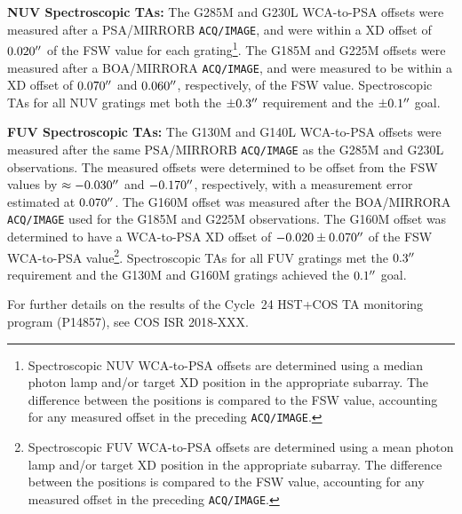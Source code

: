 \documentclass[12pt]{reportj}
\def\arcsec{\hbox{$^{\prime\prime}$}}
\newcommand{\pid}[1]{{\rm P}#1}
\newcommand{\tacq}[1]{\texttt{ACQ/#1}}
\newcommand{\tamonISR}[1]{COS ISR 2018-XXX}
\begin{document}
\begin{description}
	\clearpage
\item{\bf NUV Spectroscopic TAs:}
	The G285M and G230L WCA-to-PSA offsets were measured after a PSA/MIRRORB \tacq{IMAGE}, and were within a XD offset of $0.020\arcsec$ of the FSW value for each grating\footnote{Spectroscopic NUV WCA-to-PSA offsets are determined using a median photon lamp and/or target XD position in the appropriate subarray. The difference between the positions is compared to the FSW value, accounting for any measured offset in the preceding \tacq{IMAGE}.}.
	The G185M and G225M offsets were measured after a BOA/MIRRORA \tacq{IMAGE}, and were measured to be within a XD offset of $0.070\arcsec$ and $0.060\arcsec$, respectively, of the FSW value. Spectroscopic TAs for all NUV gratings met both the $\pm0.3\arcsec$ requirement and the $\pm0.1\arcsec$ goal.
\item{\bf FUV Spectroscopic TAs:}
	The G130M and G140L WCA-to-PSA offsets were measured after the same PSA/MIRRORB \tacq{IMAGE} as the G285M and G230L observations. The measured offsets were determined to be offset from the FSW values by $\approx -0.030\arcsec$ and $-0.170\arcsec$, respectively, with a measurement error estimated at $0.070\arcsec$. The G160M offset was measured after the BOA/MIRRORA \tacq{IMAGE} used for the G185M and G225M observations. The G160M offset was determined to have a WCA-to-PSA XD offset of $-0.020 \pm 0.070\arcsec$ of the FSW WCA-to-PSA value\footnote{Spectroscopic FUV WCA-to-PSA offsets are determined using a mean photon lamp and/or target XD position in the appropriate subarray. The difference between the positions is compared to the FSW value, accounting for any measured offset in the preceding \tacq{IMAGE}.}.
	Spectroscopic TAs for all FUV gratings met the $0.3\arcsec$ requirement and the G130M and G160M gratings achieved the $0.1\arcsec$ goal.
\end{description}

For further details on the results of the Cycle~24 HST+COS TA monitoring program (\pid{14857}), see \tamonISR{}.
\end{document}
